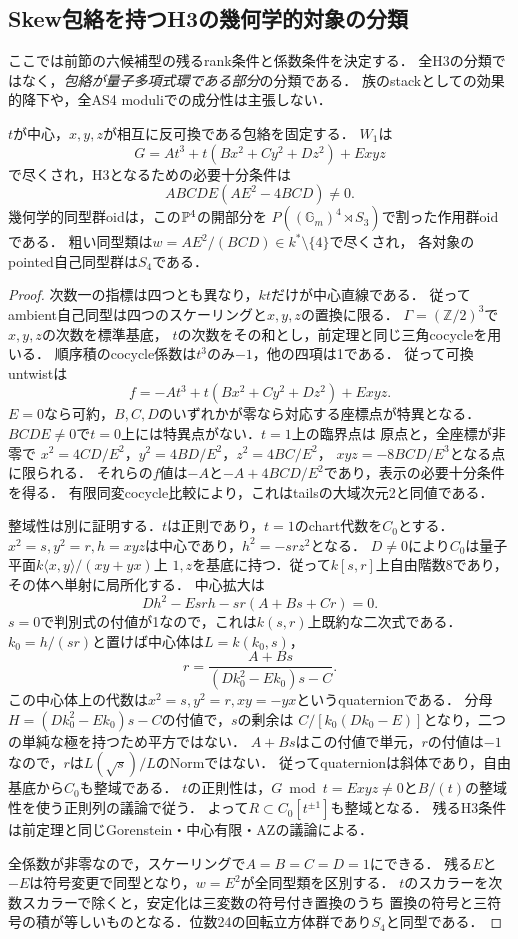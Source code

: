 \subsection{Skew包絡を持つH3の幾何学的対象の分類}
\label{sec:skew-admissible-classification}
ここでは前節の六候補型の残るrank条件と係数条件を決定する．
全H3の分類ではなく，\emph{包絡が量子多項式環である部分}の分類である．
族のstackとしての効果的降下や，全AS4 moduliでの成分性は主張しない．

\begin{proposition}[CY符号型の全admissible係数]
\label{prop:CY-sign-classification}
$t$が中心，$x,y,z$が相互に反可換である包絡を固定する．
$W_1$は
\[
 G=At^3+t(Bx^2+Cy^2+Dz^2)+Exyz
\]
で尽くされ，H3となるための必要十分条件は
\[
 ABCDE(AE^2-4BCD)\ne0.
\]
幾何学的同型群oidは，この$\mathbb P^4$の開部分を
$P((\mathbb G_m)^4\rtimes S_3)$で割った作用群oidである．
粗い同型類は$w=AE^2/(BCD)\in k^*\setminus\{4\}$で尽くされ，
各対象のpointed自己同型群は$S_4$である．
\end{proposition}
\begin{proof}
次数一の指標は四つとも異なり，$kt$だけが中心直線である．
従ってambient自己同型は四つのスケーリングと$x,y,z$の置換に限る．
$\Gamma=(\mathbb Z/2)^3$で$x,y,z$の次数を標準基底，
$t$の次数をその和とし，前定理と同じ三角cocycleを用いる．
順序積のcocycle係数は$t^3$のみ$-1$，他の四項は1である．
従って可換untwistは
\[
 f=-At^3+t(Bx^2+Cy^2+Dz^2)+Exyz.
\]
$E=0$なら可約，$B,C,D$のいずれかが零なら対応する座標点が特異となる．
$BCD E\ne0$で$t=0$上には特異点がない．$t=1$上の臨界点は
原点と，全座標が非零で
$x^2=4CD/E^2$，$y^2=4BD/E^2$，$z^2=4BC/E^2$，
$xyz=-8BCD/E^3$となる点に限られる．
それらの$f$値は$-A$と$-A+4BCD/E^2$であり，表示の必要十分条件を得る．
有限同変cocycle比較により，これはtailsの大域次元2と同値である．

整域性は別に証明する．$t$は正則であり，$t=1$のchart代数を$C_0$とする．
$x^2=s,y^2=r,h=xyz$は中心であり，$h^2=-srz^2$となる．
$D\ne0$により$C_0$は量子平面$k\langle x,y\rangle/(xy+yx)$上
$1,z$を基底に持つ．従って$k[s,r]$上自由階数8であり，その体へ単射に局所化する．
中心拡大は
\[
 Dh^2-Esrh-sr(A+Bs+Cr)=0.
\]
$s=0$で判別式の付値が1なので，これは$k(s,r)$上既約な二次式である．
$k_0=h/(sr)$と置けば中心体は$L=k(k_0,s)$，
\[
 r=\frac{A+Bs}{(Dk_0^2-Ek_0)s-C}.
\]
この中心体上の代数は$x^2=s,y^2=r,xy=-yx$というquaternionである．
分母$H=(Dk_0^2-Ek_0)s-C$の付値で，$s$の剰余は
$C/[k_0(Dk_0-E)]$となり，二つの単純な極を持つため平方ではない．
$A+Bs$はこの付値で単元，$r$の付値は$-1$なので，$r$は$L(\sqrt s)/L$のNormではない．
従ってquaternionは斜体であり，自由基底から$C_0$も整域である．
$t$の正則性は，$G\bmod t=Exyz\ne0$と$B/(t)$の整域性を使う正則列の議論で従う．
よって$R\subset C_0[t^{\pm1}]$も整域となる．
残るH3条件は前定理と同じGorenstein・中心有限・AZの議論による．

全係数が非零なので，スケーリングで$A=B=C=D=1$にできる．
残る$E$と$-E$は符号変更で同型となり，$w=E^2$が全同型類を区別する．
$t$のスカラーを次数スカラーで除くと，安定化は三変数の符号付き置換のうち
置換の符号と三符号の積が等しいものとなる．位数24の回転立方体群であり$S_4$と同型である．
\end{proof}

